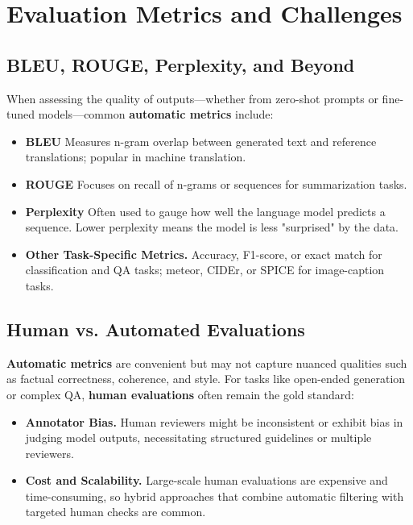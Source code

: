 \section{Evaluation Metrics and Challenges}
\label{sec:metrics_challenges}

\subsection{BLEU, ROUGE, Perplexity, and Beyond}
\noindent
When assessing the quality of outputs—whether from zero-shot prompts or fine-tuned models—common \textbf{automatic metrics} include:
\begin{itemize}
    \item \textbf{BLEU} Measures n-gram overlap between generated text and reference translations; popular in machine translation.
    \item \textbf{ROUGE} Focuses on recall of n-grams or sequences for summarization tasks.
    \item \textbf{Perplexity} Often used to gauge how well the language model predicts a sequence. Lower perplexity means the model is less "surprised" by the data.
    \item \textbf{Other Task-Specific Metrics.} Accuracy, F1-score, or exact match for classification and QA tasks; meteor, CIDEr, or SPICE for image-caption tasks.
\end{itemize}

\subsection{Human vs. Automated Evaluations}
\noindent
\textbf{Automatic metrics} are convenient but may not capture nuanced qualities such as factual correctness, coherence, and style. For tasks like open-ended generation or complex QA, \textbf{human evaluations} often remain the gold standard:
\begin{itemize}
    \item \textbf{Annotator Bias.} Human reviewers might be inconsistent or exhibit bias in judging model outputs, necessitating structured guidelines or multiple reviewers.
    \item \textbf{Cost and Scalability.} Large-scale human evaluations are expensive and time-consuming, so hybrid approaches that combine automatic filtering with targeted human checks are common.
\end{itemize}


